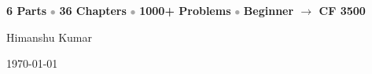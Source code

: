 \begin{titlepage}
\begin{tcolorbox}[enhanced, colback=white, colframe=primaryblue, boxrule=1.5pt,
                  arc=3mm, width=0.78\textwidth, halign=center]
\textcolor{primaryblue}{\textbf{6 Parts}}
\textcolor{darkgray}{$\bullet$}
\textcolor{primaryblue}{\textbf{36 Chapters}}
\textcolor{darkgray}{$\bullet$}
\textcolor{accentorange}{\textbf{1000+ Problems}}
\textcolor{darkgray}{$\bullet$}
\textcolor{successgreen}{\textbf{Beginner $\to$ CF 3500}}
\end{tcolorbox}

\vfill
{\Large\color{darkgray} Himanshu Kumar\par}
\vspace{0.2cm}
{\color{darkgray}\today\par}
\vspace{1.5cm}
\end{titlepage}
